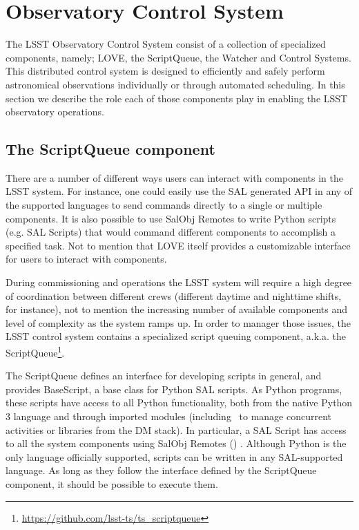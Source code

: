 \section{Observatory Control System}\label{sect:ocs}
The LSST Observatory Control System consist of a collection of specialized components, namely; LOVE, the ScriptQueue, the Watcher and Control Systems. This distributed control system is designed to efficiently and safely perform astronomical observations individually or through automated scheduling. In this section we describe the role each of those components play in enabling the LSST observatory operations. 

\subsection{The ScriptQueue component} \label{sect:scriptq}
There are a number of different ways users can interact with components in the LSST system. For instance, one could easily use the SAL generated API in any of the supported languages to send commands directly to a single or multiple components. It is also possible to use SalObj Remotes to write Python scripts (e.g. SAL Scripts) that would command different components to accomplish a specified task. Not to mention that LOVE itself provides a customizable interface for users to interact with components.

During commissioning and operations the LSST system will require a high degree of coordination between different crews (different daytime and nighttime shifts, for instance), not to mention the increasing number of available components and level of complexity as the system ramps up. In order to manager those issues, the LSST control system contains a specialized script queuing component, a.k.a. the ScriptQueue\footnote{\url{https://github.com/lsst-ts/ts_scriptqueue}}.

The ScriptQueue defines an interface for developing scripts in general, and provides BaseScript, a base class for Python SAL scripts. As Python programs, these scripts have access to all Python functionality, both from the native Python 3 language and through imported modules (including \asyncio~to manage concurrent activities or libraries from the DM stack). In particular, a SAL Script has access to all the system components using SalObj Remotes () . Although Python is the only language officially supported, scripts can be written in any SAL-supported language. As long as they follow the interface defined by the ScriptQueue component, it should be possible to execute them.

